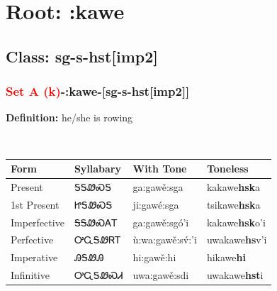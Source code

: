 \needspace{4in}
\section*{Root: :kawe}
\nopagebreak
{}
\needspace{3in}
\subsection*{Class: sg-s-hst[imp2]}
\nopagebreak
\needspace{2in}
\subsubsection*{\textcolor{Red}{Set A (k)}{-}\textbf{:kawe}{-}[sg-s-hst[imp2]]}
\nopagebreak
\textbf{Definition: } he/she is rowing
\\[0.5em]
\begin{tabularx}{\textwidth}{l X X X}%
\toprule%
\textbf{Form}&\textbf{Syllabary}&\textbf{With Tone}&\textbf{Toneless}\\%
\midrule%
Present&ᎦᎦᏪᏍᎦ&ga:gawě:sga&kakawe\textbf{hsk}a\\%
1st Present&ᏥᎦᏪᏍᎦ&ji:gawé:sga&tsikawe\textbf{hsk}a\\%
Imperfective&ᎦᎦᏪᏍᎪᎢ&ga:gawě:sgó’i&kakawe\textbf{hsk}o'i\\%
Perfective&ᎤᏩᎦᏪᏒᎢ&ù:wa:gawě:sv́:’i&uwakawe\textbf{hs}v'i\\%
Imperative&ᎯᎦᏪᎯ&hi:gawě:hi&hikawe\textbf{hi}\\%
Infinitive&ᎤᏩᎦᏪᏍᏗ&uwa:gawě:sdi&uwakawe\textbf{hst}i\\%
\bottomrule%
\end{tabularx}
\\[1em]